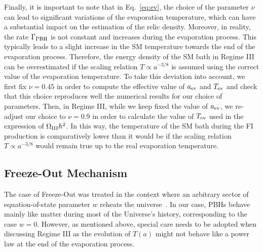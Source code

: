 \documentclass[aps,prd,reprint,twocolumn,preprintnumbers,floatfix,nofootinbib]{revtex4-1}
\begin{document}
Finally, it is important to note that in Eq.~\eqref{eq:ev}, the choice of the parameter $\nu$ can lead to significant variations of the evaporation temperature, which can have a substantial impact on the estimation of the relic density. Moreover, in reality, the rate $\Gamma_{\rm PBH}$ is not constant and increases during the evaporation process. This typically leads to a slight increase in the SM temperature towards the end of the evaporation process. Therefore, the energy density of the SM bath in Regime III can be overestimated if the scaling relation $T\propto a^{-3/8}$ is assumed using the correct value of the evaporation temperature. To take this deviation into account, we first fix $\nu=0.45$ in order to compute the effective value of $a_{\rm ev}$ and $T_{\rm ev}$ and check that this choice reproduces well the numerical results for our choice of parameters. Then, in Regime III, while we keep fixed the value of $a_{\rm ev}$, we re-adjust our choice to $\nu=0.9$ in order to calculate the value of $T_{\rm ev}$ used in the expression of $\Omega_{\rm III} h^2$. In this way, the temperature of the SM bath during the FI production is comparatively lower than it would be if the scaling relation $T\propto a^{-3/8}$ would remain true up to the real evaporation temperature.


\subsection{Freeze-Out Mechanism}

The case of Freeze-Out was treated in the context where an arbitrary sector of equation-of-state parameter $w$ reheats the universe~\cite{Arias:2019uol}. In our case, PBHs behave mainly like matter during most of the Universe's history, corresponding to the case $w=0$. However, as mentioned above, special care needs to be adopted when discussing Regime III as the evolution of $T(a)$ might not behave like a power law at the end of the evaporation process. 
\end{document}

